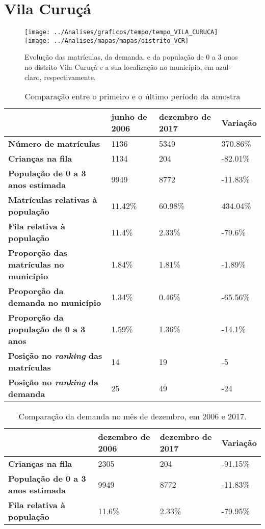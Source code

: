 \section{Vila Curuçá}
\begin{figure}[H]
\centering
\texttt{[image: ../Analises/graficos/tempo/tempo\_VILA\_CURUCA]}
\texttt{[image: ../Analises/mapas/mapas/distrito\_VCR]}
\caption{Evolução das matrículas, da demanda, e da população de 0 a 3 anos no distrito Vila Curuçá e a sua localização no município, em azul-claro, respectivamente.}
\end{figure}
\begin{table}[H]
\begin{tabular}{l|l|l|l}
\textbf{}                                      & \textbf{junho de 2006}       & \textbf{dezembro de 2017}    & \textbf{Variação} \\ \hline
\textbf{Número de matrículas}                  & 1136 & 5349 & 370.86\% \\ \hline
\textbf{Crianças na fila}                      & 1134 & 204 & -82.01\% \\ \hline
\textbf{População de 0 a 3 anos estimada}      & 9949 & 8772 & -11.83\% \\ \hline
\textbf{Matrículas relativas à população}      & 11.42\% & 60.98\% & 434.04\% \\ \hline
\textbf{Fila relativa à população}             & 11.4\% & 2.33\% & -79.6\% \\ \hline
\textbf{Proporção das matrículas no município} & 1.84\% & 1.81\% & -1.89\% \\ \hline
\textbf{Proporção da demanda no município}     & 1.34\% & 0.46\% & -65.56\% \\ \hline
\textbf{Proporção da população de 0 a 3 anos}  & 1.59\% & 1.36\% & -14.1\% \\ \hline
\textbf{Posição no \textit{ranking} das matrículas}     & 14 & 19 & -5 \\ \hline
\textbf{Posição no \textit{ranking} da demanda}         & 25 & 49 & -24 \\ 
\end{tabular}
\caption{Comparação entre o primeiro e o último período da amostra}
\end{table}
\begin{table}[H]
\begin{tabular}{l|l|l|l}
\textbf{}                                 & \textbf{dezembro de 2006} & \textbf{dezembro de 2017} & \textbf{Variação} \\ \hline
\textbf{Crianças na fila}                      & 2305 & 204 & -91.15\% \\ \hline
\textbf{População de 0 a 3 anos estimada}      & 9949 & 8772 & -11.83\% \\ \hline
\textbf{Fila relativa à população}             & 11.6\% & 2.33\% & -79.95\% \\
\end{tabular}
\caption{Comparação da demanda no mês de dezembro, em 2006 e 2017.}
\end{table}
